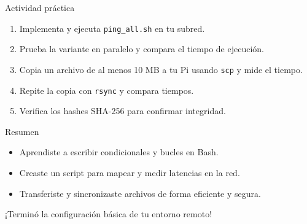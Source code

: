 \documentclass[aspectratio=169,professionalfonts]{beamer}
\begin{document}
\begin{frame}[fragile]{Actividad práctica}
  \begin{enumerate}
    \item Implementa y ejecuta \texttt{ping\_all.sh} en tu subred.
    \item Prueba la variante en paralelo y compara el tiempo de ejecución.
    \item Copia un archivo de al menos 10 MB a tu Pi usando \texttt{scp} y mide el tiempo.
    \item Repite la copia con \texttt{rsync} y compara tiempos.
    \item Verifica los hashes SHA-256 para confirmar integridad.
  \end{enumerate}
\end{frame}

\begin{frame}[fragile]{Resumen}
  \begin{itemize}
    \item Aprendiste a escribir condicionales y bucles en Bash.
    \item Creaste un script para mapear y medir latencias en la red.
    \item Transferiste y sincronizaste archivos de forma eficiente y segura.
  \end{itemize}
  \vspace{0.5em}
  ¡Terminó la configuración básica de tu entorno remoto!
\end{frame}
\end{document}
